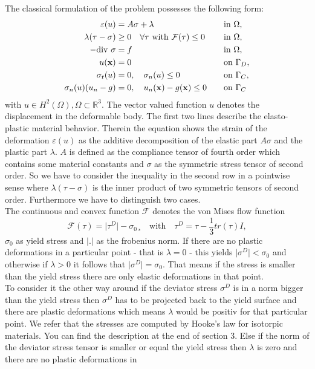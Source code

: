 \documentclass{article}
\begin{document}
The classical formulation of the problem possesses the following form:
\begin{align*}
 \varepsilon(u) &= A\sigma + \lambda & &\quad\text{in } \Omega,\\
 \lambda(\tau - \sigma) &\geq 0\quad\forall\tau\text{ with
 }\mathcal{F}(\tau)\leq 0 & &\quad\text{in } \Omega,\\
 -\textrm{\textrm{div}}\ \sigma &= f & &\quad\text{in } \Omega,\\
 u(\mathbf x) &= 0 & &\quad\text{on }\Gamma_D,\\
 \sigma_t(u) &= 0,\quad\sigma_n(u)\leq 0 & &\quad\text{on }\Gamma_C,\\
\sigma_n(u)(u_n - g) &= 0,\quad u_n(\mathbf x) - g(\mathbf x) \leq 0 & &\quad\text{on } \Gamma_C
\end{align*}
with $u\in H^2(\Omega),\Omega\subset\mathbb{R}^3$.  The vector valued
function $u$ denotes the displacement in the deformable body. The first two lines describe the
elasto-plastic material behavior. Therein the equation shows the
strain of the deformation $\varepsilon (u)$ as the additive decomposition of the
elastic part $A\sigma$ and the plastic part $\lambda$. $A$ is defined as the
compliance tensor of fourth order which contains some material constants and
$\sigma$ as the symmetric stress tensor of second order. So we have to consider
the inequality in the second row in a pointwise sense where $\lambda(\tau -
\sigma)$ is the inner product of two symmetric tensors of second order.
Furthermore we have to distinguish two cases.\\
The continuous and convex function $\mathcal{F}$ denotes the von Mises flow function
$$\mathcal{F}(\tau) = \vert\tau^D\vert - \sigma_0¸\quad\text{with}\quad \tau^D
= \tau - \dfrac{1}{3}tr(\tau)I,$$
$\sigma_0$ as yield stress and $\vert .\vert$ as the frobenius norm. If there
are no plastic deformations in a particular point - that is $\lambda=0$ - this yields $\vert\sigma^D\vert <
\sigma_0$ and otherwise if $\lambda > 0$ it follows that $\vert\sigma^D\vert = \sigma_0$.
That means if the stress is smaller than the yield stress there are only elastic
deformations in that point.\\
To consider it the other way around if the deviator stress $\sigma^D$ is in a
norm bigger than the yield stress then $\sigma^D$ has to be projected back to the yield surface and there are plastic deformations which means $\lambda$
would be positiv for that particular point. We refer that the stresses are
computed by Hooke's law for isotorpic materials. You can find the description at the end of section 3. Else if the norm of the deviator stress tensor is smaller or equal the yield stress then $\lambda$ is zero and there are no plastic deformations in
\end{document}
